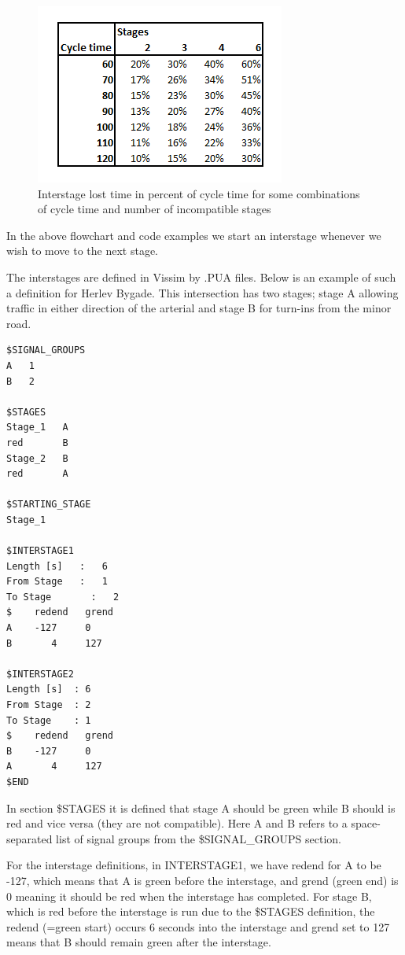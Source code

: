 \begin{figure}[ht]
\centering
\includegraphics[scale=0.6]{interstage_lost_time.png} 
\caption{Interstage lost time in percent of cycle time for some combinations of cycle time and number of incompatible stages}
\label{fig:lost_time_example}
\end{figure}

In the above flowchart and code examples we start an interstage whenever we wish to move to the next stage.

The interstages are defined in Vissim by .PUA files. Below is an example of such a definition for Herlev Bygade. This intersection has two stages; stage A allowing traffic in either direction of the arterial and stage B for turn-ins from the minor road. 

\begin{verbatim}
$SIGNAL_GROUPS
A   1
B   2

$STAGES
Stage_1   A
red       B
Stage_2   B
red       A

$STARTING_STAGE
Stage_1

$INTERSTAGE1
Length [s]	 :   6
From Stage	 :   1
To Stage	   :   2
$    redend   grend
A    -127     0
B       4     127

$INTERSTAGE2
Length [s]	: 6
From Stage	: 2
To Stage	: 1
$    redend   grend
B    -127     0
A       4     127
$END
\end{verbatim}

In section \$STAGES it is defined that stage A should be green while B should is red and vice versa (they are not compatible). Here A and B refers to a space-separated list of signal groups from the \$SIGNAL\_GROUPS section.

For the interstage definitions, in INTERSTAGE1, we have redend for A to be -127, which means that A is green before the interstage, and grend (green end) is 0 meaning it should be red when the interstage has completed. For stage B, which is red before the interstage is run due to the \$STAGES definition, the redend (=green start) occurs 6 seconds into the interstage and grend set to 127 means that B should remain green after the interstage.

